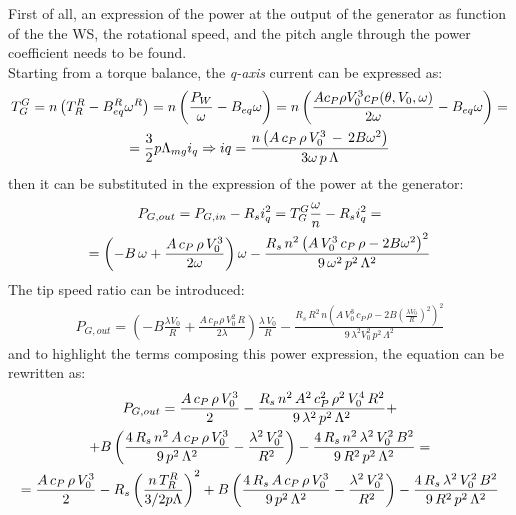First of all, an expression of the power at the output of the generator as function of the the WS, the rotational speed, and the pitch angle through the power coefficient needs to be found. \\
Starting from a torque balance, the \textit{q-axis} current can be expressed as:
\begin{gather}
  T_G^G = n\left(T_R^R - B_{eq}^R\omega^R\right) = n\left(\frac{P_W}{\omega} - B_{eq}\omega\right) = n\left(\frac{A c_P \rho V_0^3 c_P(\theta, V_0, \omega)}{2\omega} - B_{eq}\omega\right) = \notag \\
   = \frac{3}{2}p\Lambda_{mg}i_q \Rightarrow iq = \frac{n\left(A \, c_P \, \rho \, V_0^3 \,-\,2B\omega^2\right)}{3\omega\,p\,\Lambda} 
\end{gather}
then it can be substituted in the expression of the power at the generator:
\begin{gather}
  P_{G, out} = P_{G, in} - R_s i_q^2 = T_G^G \frac{\omega}{n} - R_s i_q^2 = \\ \notag
  = \left(-B\,\omega + \frac{A\,c_P\,\rho\,V_0^3}{2\omega}\right)\omega - \frac{R_s\, n^2\left(A\,V_0^3\,c_P\,\rho - 2B\omega^2\right)^2}{9\,\omega^2\,p^2\,\Lambda^2} \label{eq:P_G_out_eq}
\end{gather}
The tip speed ratio can be introduced:
\begin{gather}
  P_{G, out} = \left(-B\frac{\lambda V_0}{R} + \frac{A\,c_P\,\rho\,V_0^2\,R}{2\lambda}\right)\frac{\lambda \, V_0}{R} - \frac{R_s\,R^2\,n\left(A\,V_0^3\,c_P\,\rho - 2B\left(\frac{\lambda V_0}{R}\right)^2\right)^2}{9\,\lambda^2V_0^2\,p^2\,\Lambda^2}\label{eq:P_G_out_lambda}
\end{gather} 
and to highlight the terms composing this power expression, the equation can be rewritten as:
\begin{gather} 
   P_{G, out} = \frac{A\,c_P\,\rho\,V_0^3}{2} - \frac{R_s\,n^2\,A^2\,c_P^2\,\rho^2\,V_0^4\,R^2}{9\,\lambda^2\,p^2\,\Lambda^2} + \notag \\
   +B\left(\frac{4\,R_s\,n^2\,A\,c_P\,\rho\,V_0^3}{9\,p^2\,\Lambda^2} - \frac{\lambda^2\,V_0^2}{R^2}\right) - \frac{4\,R_s\,n^2\,\lambda^2\,V_0^2\,B^2}{9\,R^2\,p^2\,\Lambda^2} =  \notag \\
   = \frac{A\,c_P\,\rho\,V_0^3}{2} - R_s \left(\frac{n\,T_R^R}{3/2p\Lambda}\right)^2 + B\left(\frac{4\,R_s\,A\,c_P\,\rho\,V_0^3}{9\,p^2\,\Lambda^2} - \frac{\lambda^2\,V_0^2}{R^2}\right) - \frac{4\,R_s\,\lambda^2\,V_0^2\,B^2}{9\,R^2\,p^2\,\Lambda^2} \label{eq:P_G_out_damping}
\end{gather}

